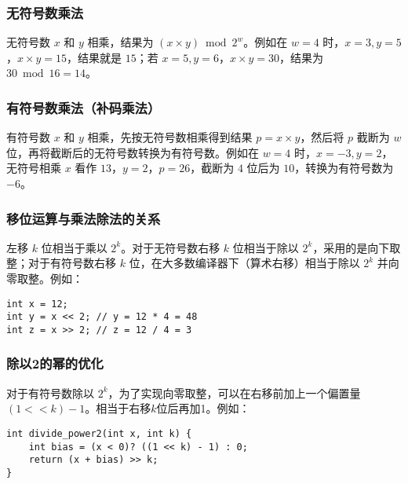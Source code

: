 \subsubsection{无符号数乘法}
无符号数 \(x\) 和 \(y\) 相乘，结果为 \((x\times y)\bmod 2^{w}\)。例如在 \(w = 4\) 时，\(x = 3,y = 5\)，\(x\times y = 15\)，结果就是 \(15\)；若 \(x = 5,y = 6\)，\(x\times y = 30\)，结果为 \(30\bmod 16 = 14\)。
\subsubsection{有符号数乘法（补码乘法）}
有符号数 \(x\) 和 \(y\) 相乘，先按无符号数相乘得到结果 \(p=x\times y\)，然后将 \(p\) 截断为 \(w\) 位，再将截断后的无符号数转换为有符号数。例如在 \(w = 4\) 时，\(x=-3,y = 2\)，无符号相乘 \(x\) 看作 \(13\)，\(y = 2\)，\(p = 26\)，截断为 \(4\) 位后为 \(10\)，转换为有符号数为 \(-6\)。
\subsubsection{移位运算与乘法除法的关系}
左移 \(k\) 位相当于乘以 \(2^{k}\)。对于无符号数右移 \(k\) 位相当于除以 \(2^{k}\)，采用的是向下取整；对于有符号数右移 \(k\) 位，在大多数编译器下（算术右移）相当于除以 \(2^{k}\) 并向零取整。例如：
\begin{verbatim}
int x = 12;
int y = x << 2; // y = 12 * 4 = 48
int z = x >> 2; // z = 12 / 4 = 3
\end{verbatim}
\subsubsection{除以2的幂的优化}
对于有符号数除以 \(2^{k}\)，为了实现向零取整，可以在右移前加上一个偏置量 \((1<<k)-1\)。相当于右移$k$位后再加1。例如：
\begin{verbatim}
int divide_power2(int x, int k) {
    int bias = (x < 0)? ((1 << k) - 1) : 0;
    return (x + bias) >> k;
}
\end{verbatim}